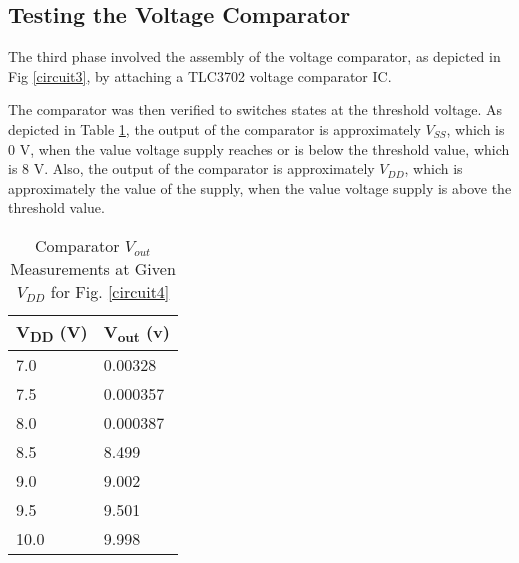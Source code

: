 \documentclass[conference]{IEEEtran}
\begin{document}

\subsection{Testing the Voltage Comparator}

The third phase involved the assembly of the voltage comparator, as depicted in Fig \ref{circuit3}, by attaching a TLC3702 voltage comparator IC.


The comparator was then verified to switches states at the threshold voltage. As depicted in Table \ref{tab2}, the output of the comparator is approximately $V_{SS}$, which is 0 V, when the value voltage supply reaches or is below the threshold value, which is 8 V. Also, the output of the comparator is approximately $V_{DD}$, which is approximately the value of the supply, when the value voltage supply is above the threshold value.

\begin{table}[htp]
\caption{Comparator $V_{out}$ Measurements at Given $V_{DD}$ for Fig. \ref{circuit4}}
\begin{center}
\begin{tabular}{|p{}|p{}|}
\hline
\textbf{V\textsubscript{DD} (V)}&\textbf{V\textsubscript{out} (v)} \\
\hline
7.0 & 0.00328 \\ \hline
7.5 & 0.000357 \\ \hline
8.0 & 0.000387 \\ \hline
8.5 & 8.499 \\ \hline
9.0 & 9.002 \\ \hline
9.5 & 9.501 \\ \hline
10.0 & 9.998 \\ \hline
\end{tabular}
\label{tab2}
\end{center}
\end{table}
\end{document}
